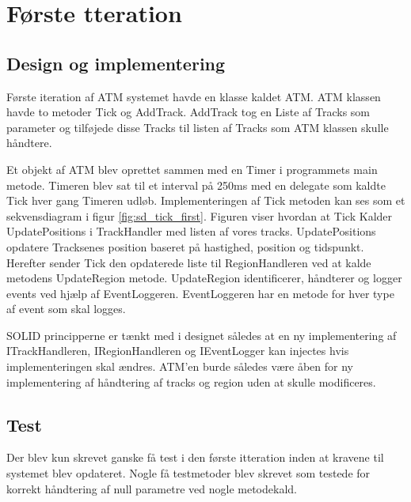 \thispagestyle{fancy}
\chapter{Første tteration}
\label{chp:FirstItteration}

\section{Design og implementering}


Første iteration af ATM systemet havde en klasse kaldet ATM. ATM klassen havde to metoder Tick og AddTrack. AddTrack tog en Liste af Tracks som parameter og tilføjede disse Tracks til listen af Tracks som ATM klassen skulle håndtere. 

Et objekt af ATM blev oprettet sammen med en Timer i programmets main metode. Timeren blev sat til et interval på 250ms med en delegate som kaldte Tick hver gang Timeren udløb. Implementeringen af Tick metoden kan ses som et sekvensdiagram i figur \ref{fig:sd_tick_first}. Figuren viser hvordan at Tick Kalder UpdatePositions i TrackHandler med listen af vores tracks. UpdatePositions opdatere Tracksenes position baseret på hastighed, position og tidspunkt. Herefter sender Tick den opdaterede liste til RegionHandleren ved at kalde metodens UpdateRegion metode. UpdateRegion identificerer, håndterer og logger events ved hjælp af EventLoggeren. EventLoggeren har en metode for hver type af event som skal logges.

SOLID principperne er tænkt med i designet således at en ny implementering af ITrackHandleren, IRegionHandleren og IEventLogger kan injectes hvis implementeringen skal ændres. ATM'en burde således være åben for ny implementering af håndtering af tracks og region uden at skulle modificeres.

\section{Test}
Der blev kun skrevet ganske få test i den første itteration inden at kravene til systemet blev opdateret. Nogle få testmetoder blev skrevet som testede for korrekt håndtering af null parametre ved nogle metodekald.


